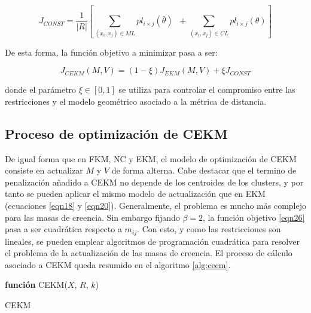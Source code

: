 \begin{equation}
J_{CONST} = \frac{1}{|R|} \left[\sum_{(x_i,x_j) \in ML} pl_{i\times j} (\bar{\theta})\;\; + \sum_{(x_i,x_j) \in CL} pl_{i\times j} (\theta)\right]
\label{eqn25}
\end{equation}

De esta forma, la función objetivo a minimizar pasa a ser:

\begin{equation}
J_{CEKM}(M,V) = (1- \xi)J_{EKM}(M,V) + \xi J_{CONST}
\label{eqn26}
\end{equation}

donde el parámetro $\xi \in [0,1]$ se utiliza para controlar el compromiso entre las restricciones y el modelo geométrico asociado a la métrica de distancia.

\subsection{Proceso de optimización de CEKM}

De igual forma que en \acs{FKM}, \acs{NC} y \acs{EKM}, el modelo de optimización de \acs{CEKM} consiste en actualizar $M$ y $V$ de forma alterna. Cabe destacar que el termino de penalización añadido a \acs{CEKM} no depende de los centroides de los clusters, y por tanto se pueden aplicar el mismo modelo de actualización que en \acs{EKM} (ecuaciones \ref{eqn18} y \ref{eqn20}). Generalmente, el problema es mucho más complejo para las masas de creencia. Sin embargo fijando $\beta = 2$, la función objetivo \ref{eqn26} pasa a ser cuadrática respecto a $m_{ij}$. Con esto, y como las restricciones son lineales, se pueden emplear algoritmos de programación cuadrática para resolver el problema de la actualización de las masas de creencia. El proceso de cálculo asociado a \acs{CEKM} queda resumido en el algoritmo \ref{alg:cecm}. 


\begin{algorithm}
	
	\BlankLine
	\BlankLine
	\textbf{función} CEKM($X$, $R$, $k$) 
	\caption{\acs{CEKM}}
	\label{alg:cecm}
\end{algorithm}

